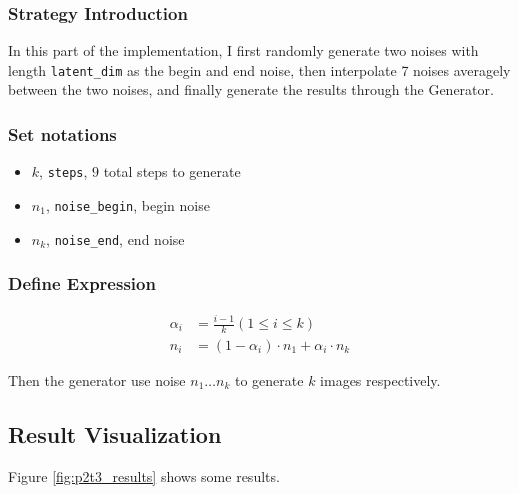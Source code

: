 \documentclass{article}
\begin{document}
\subsubsection{Strategy Introduction}

In this part of the implementation, I first randomly generate two noises with length \texttt{latent\_dim} as the begin and end noise, then interpolate 7 noises averagely between the two noises, and finally generate the results through the Generator.

\subsubsection{Set notations}

\begin{itemize}
    \item $k$, \texttt{steps}, $9$ total steps to generate
    \item $n_1$, \texttt{noise\_begin}, begin noise
    \item $n_k$, \texttt{noise\_end}, end noise
\end{itemize}

\subsubsection{Define Expression}

\begin{align}
    \alpha_i &= \frac{i-1}{k} (1 \leq i \leq k) \\
    n_i &= (1 - \alpha_i) \cdot n_1 +\alpha_i \cdot n_k 
\end{align}

Then the generator use noise $n_1 \ldots n_k$ to generate $k$ images respectively.

\subsection{Result Visualization}

Figure \ref{fig:p2t3_results} shows some results.
\end{document}
